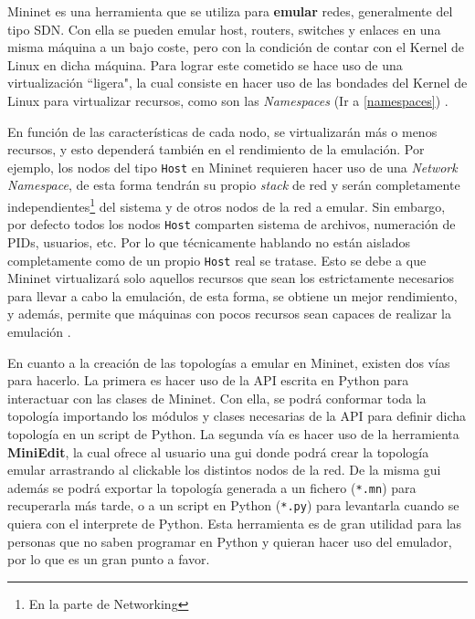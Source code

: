 Mininet es una herramienta que se  utiliza para \textbf{emular} redes,  generalmente del tipo SDN. Con ella se pueden emular host, routers, switches y enlaces en una misma máquina a un bajo coste, pero con la condición de contar con el Kernel de Linux en dicha máquina. Para lograr este cometido se hace uso de una virtualización ``ligera", la cual consiste en hacer uso de las bondades del Kernel de Linux para virtualizar recursos, como son las \textit{Namespaces} (Ir a \ref{namespaces}) \cite{lantz2010network}.\\
\par
En función de las características de cada nodo, se virtualizarán más o menos recursos, y esto dependerá también en el rendimiento de la emulación. Por ejemplo, los nodos del tipo \texttt{Host} en Mininet requieren hacer uso de una \textit{Network Namespace}, de esta forma tendrán su propio \textit{stack} de red y serán completamente independientes\footnote{En la parte de Networking} del sistema y de otros nodos de la red a emular. Sin embargo, por defecto todos los nodos \texttt{Host} comparten sistema de archivos, numeración de PIDs, usuarios, etc. Por lo que técnicamente hablando no están aislados completamente como de un propio \texttt{Host} real se tratase. Esto se debe a que Mininet virtualizará solo aquellos recursos que sean los estrictamente necesarios para llevar a cabo la emulación, de esta forma, se obtiene un mejor rendimiento, y además, permite que máquinas con pocos recursos sean capaces de realizar la emulación \cite{lantz2010network}.\\
\par
En cuanto a la creación de las topologías a emular en Mininet, existen dos vías para hacerlo. La primera es hacer uso de la API escrita en Python para interactuar con las clases de Mininet. Con ella, se podrá conformar toda la topología importando los módulos y clases necesarias de la API para definir dicha topología en un script de Python. La segunda vía es hacer uso de la herramienta \textbf{MiniEdit}, la cual ofrece al usuario una \gls{gui} donde podrá crear la topología emular arrastrando al clickable los distintos nodos de la red. De la misma \gls{gui} además se podrá exportar la topología generada a un fichero (\texttt{*.mn}) para recuperarla más tarde, o a un script en Python (\texttt{*.py}) para levantarla cuando se quiera con el interprete de Python.  Esta herramienta es de gran utilidad para las personas que no saben programar en Python y quieran hacer uso del emulador, por lo que es un gran punto a favor.\\
\par

